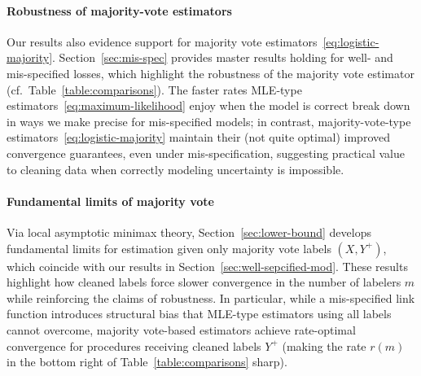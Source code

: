 \documentclass[11pt]{article}
\newcommand{\majY}{Y^+}
\newcommand{\<}{\langle} %
\renewcommand{\>}{\rangle}
\begin{document}
\paragraph{Robustness of majority-vote estimators}
Our results also evidence support for majority vote
estimators~\eqref{eq:logistic-majority}.  Section~\ref{sec:mis-spec}
provides master results holding for well- and mis-specified losses, which
highlight the robustness of the majority vote estimator
(cf.\ Table~\ref{table:comparisons}).
%
The faster rates MLE-type estimators~\eqref{eq:maximum-likelihood} enjoy
when the model is correct break down in ways we make precise for
mis-specified models; in contrast, majority-vote-type
estimators~\eqref{eq:logistic-majority} maintain their (not quite optimal)
improved convergence guarantees, even under mis-specification, suggesting
practical value to cleaning data when correctly modeling uncertainty is
impossible.

\paragraph{Fundamental limits of majority vote}
Via local asymptotic minimax theory, Section~\ref{sec:lower-bound} develops
fundamental limits for estimation given only majority vote labels $(X,
\majY)$, which coincide with our results in
Section~\ref{sec:well-sepcified-mod}.
%
These results highlight how cleaned labels force slower
convergence in the number of labelers $m$ while reinforcing the claims of
robustness.
%
In particular, while a mis-specified link function introduces structural
bias that MLE-type estimators using all labels cannot overcome, majority
vote-based estimators achieve rate-optimal convergence for procedures
receiving cleaned labels $\majY$ (making the rate $r(m)$ in the bottom right
of Table~\ref{table:comparisons} sharp).



\end{document}

